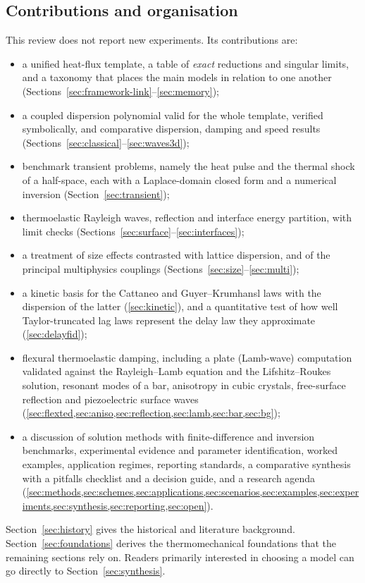 \subsection{Contributions and organisation}
This review does not report new experiments. Its contributions are:
\begin{itemize}
\item a unified heat-flux template, a table of \emph{exact} reductions and singular limits, and a taxonomy that places the main models in relation to one another (Sections~\ref{sec:framework-link}--\ref{sec:memory});
\item a coupled dispersion polynomial valid for the whole template, verified symbolically, and comparative dispersion, damping and speed results (Sections~\ref{sec:classical}--\ref{sec:waves3d});
\item benchmark transient problems, namely the heat pulse and the thermal shock of a half-space, each with a Laplace-domain closed form and a numerical inversion (Section~\ref{sec:transient});
\item thermoelastic Rayleigh waves, reflection and interface energy partition, with limit checks (Sections~\ref{sec:surface}--\ref{sec:interfaces});
\item a treatment of size effects contrasted with lattice dispersion, and of the principal multiphysics couplings (Sections~\ref{sec:size}--\ref{sec:multi});
\item a kinetic basis for the Cattaneo and Guyer--Krumhansl laws with the dispersion of the latter (\cref{sec:kinetic}), and a quantitative test of how well Taylor-truncated lag laws represent the delay law they approximate (\cref{sec:delayfid});
\item flexural thermoelastic damping, including a plate (Lamb-wave) computation validated against the Rayleigh--Lamb equation and the Lifshitz--Roukes solution, resonant modes of a bar, anisotropy in cubic crystals, free-surface reflection and piezoelectric surface waves (\cref{sec:flexted,sec:aniso,sec:reflection,sec:lamb,sec:bar,sec:bg});
\item a discussion of solution methods with finite-difference and inversion benchmarks, experimental evidence and parameter identification, worked examples, application regimes, reporting standards, a comparative synthesis with a pitfalls checklist and a decision guide, and a research agenda (\cref{sec:methods,sec:schemes,sec:applications,sec:scenarios,sec:examples,sec:experiments,sec:synthesis,sec:reporting,sec:open}).
\end{itemize}
Section~\ref{sec:history} gives the historical and literature background. Section~\ref{sec:foundations} derives the thermomechanical foundations that the remaining sections rely on. Readers primarily interested in choosing a model can go directly to Section~\ref{sec:synthesis}.

